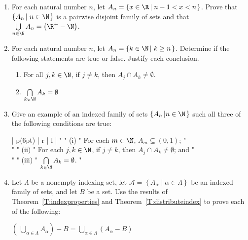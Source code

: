 \begin{enumerate}
\item For each natural number $n$, let \label{exer:pairwisedisjoint}
$A_n = \left\{ x \in \R \left| \hspace{3pt} n -1 < x < n \right. \right\}$.  Prove that 
$\left\{ A_n \left| \hspace{3pt} n \in \N \right. \right\}$ is a pairwise disjoint family of sets and that 
\linebreak
$\bigcup\limits_{n \in \N}^{}A_n = \left( \R^+ - \N \right)$.


\item For each natural number $n$, let 
$A_n = \left\{ k \in \N \left| \hspace{3pt} k \geq n \right. \right\}$.  
\label{exer:sec45-notpairdisjoint}
Determine if the following statements are true or false.  Justify each conclusion.

\begin{enumerate}
\item For all $j, k \in \N$, if $j \ne k$, then $A_j \cap A_k \ne \emptyset$.
\item $\bigcap\limits_{k \in \N}^{}A_k = \emptyset$
\end{enumerate}


\item Give an example of an indexed family of sets $\left\{ A_n \left| n \in \N \right. \right\}$ such all three of the following conditions are true: \label{exer:notpairdisjoint2}

\BeginTable
\BeginFormat
| p(6pt) | r | l |
\EndFormat
"  " (i) " For each $m \in \N$, $A_m \subseteq (0, 1)$; " \\
"  " (ii) " For each $j, k \in \N$, if $j \ne k$, then $A_j \cap A_k \ne \emptyset$; and " \\
"  " (iii) " $\bigcap\limits_{k \in \N}^{}A_k = \emptyset$. " \\
\EndTable


\item Let $\Lambda$ be a nonempty indexing set, let \label{exer:gendemorgan}
$\mathscr{A} = \left\{ A_\alpha \mid \alpha \in \Lambda \right\}$ be an indexed family of sets, and let $B$ be a set.  Use the results of Theorem~\ref{T:indexproperties} and 
Theorem~\ref{T:distributeindex} to prove each of the following:

\begin{enumerate}
\yitem $\left(\:\bigcup\limits_{\alpha \in \Lambda}^{}A_{\alpha} \right) - B 
= \bigcup\limits_{\alpha \in \Lambda}^{} \left( A_{\alpha} - B \right)$


\end{enumerate}
\end{enumerate}

